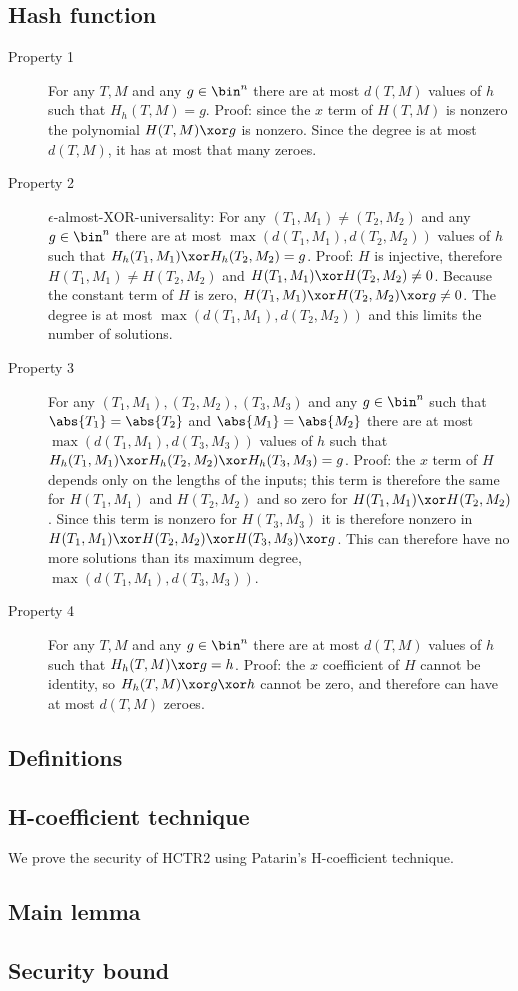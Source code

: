 \documentclass[letterpaper,11pt]{article}
\begin{document}
\subsection{Hash function}
\begin{description}
    \item[Property 1]
    For any \(T, M\) and any \(g \in \bin^n\)
    there are at most \(d(T, M)\)
    values of \(h\) such that \(H_h(T, M) = g\).
    Proof: since the \(x\) term of \(H(T, M)\) is nonzero
    the polynomial \(H(T, M) \xor g\) is nonzero.
    Since the degree is at most \(d(T, M)\), it has
    at most that many zeroes.
    \item[Property 2] 
    \(\epsilon\)-almost-XOR-universality: 
    For any \((T_1, M_1) \neq (T_2, M_2)\) and any \(g \in \bin^n\)
    there are at most \(\max(d(T_1, M_1), d(T_2, M_2))\)
    values of \(h\) such that \(H_h(T_1, M_1) \xor H_h(T_2, M_2) = g\).
    Proof: \(H\) is injective, therefore
    \(H(T_1, M_1) \neq H(T_2, M_2)\)
    and \(H(T_1, M_1) \xor H(T_2, M_2) \neq 0\).
    Because the constant term of \(H\) is zero, 
    \(H(T_1, M_1) \xor H(T_2, M_2) \xor g \neq 0\).
    The degree is at most \(\max(d(T_1, M_1), d(T_2, M_2))\)
    and this limits the number of solutions.
    \item[Property 3]
    For any \((T_1, M_1), (T_2, M_2), (T_3, M_3)\) and any \(g \in \bin^n\)
    such that \(\abs{T_1} = \abs{T_2}\) and \(\abs{M_1} = \abs{M_2}\)
    there are at most \(\max(d(T_1, M_1), d(T_3, M_3))\)
    values of \(h\) such that
    \(H_h(T_1, M_1) \xor H_h(T_2, M_2) \xor H_h(T_3, M_3) = g\).
    Proof: the \(x\) term of \(H\) depends only on
    the lengths of the inputs; this term is therefore the same for
    \(H(T_1, M_1)\) and \(H(T_2, M_2)\) and so zero for 
    \(H(T_1, M_1) \xor H(T_2, M_2)\). Since this term
    is nonzero for \(H(T_3, M_3)\) it is therefore
    nonzero in
    \(H(T_1, M_1) \xor H(T_2, M_2) \xor H(T_3, M_3) \xor g\).
    This can therefore have no more solutions than
    its maximum degree,
    \(\max(d(T_1, M_1), d(T_3, M_3))\).
    \item[Property 4]
    For any \(T, M\) and any \(g \in \bin^n\)
    there are at most \(d(T, M)\)
    values of \(h\) such that \(H_h(T, M) \xor g = h\).
    Proof: the \(x\) coefficient of \(H\) cannot be identity,
    so \(H_h(T, M) \xor g \xor h\) cannot be zero, and
    therefore can have at most \(d(T, M)\) zeroes.
\end{description}

\subsection{Definitions}
\subsection{H-coefficient technique}

We prove the security of HCTR2 using Patarin's H-coefficient technique. 

\subsection{Main lemma}
\subsection{Security bound}

\printbibliography[heading=bibintoc]
\end{document}
